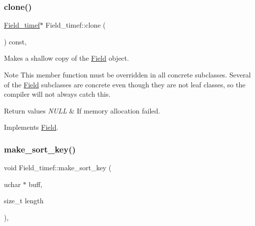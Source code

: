 \subsubsection{\texorpdfstring{clone()}{clone()}\hspace{0.1cm}{\footnotesize\ttfamily [2/2]}}
{\footnotesize\ttfamily \mbox{\hyperlink{classField__timef}{Field\+\_\+timef}}$\ast$ Field\+\_\+timef\+::clone (\begin{DoxyParamCaption}{ }\end{DoxyParamCaption}) const\hspace{0.3cm}{\ttfamily [inline]}, {\ttfamily [virtual]}}

Makes a shallow copy of the \mbox{\hyperlink{classField}{Field}} object.

\begin{DoxyNote}{Note}
This member function must be overridden in all concrete subclasses. Several of the \mbox{\hyperlink{classField}{Field}} subclasses are concrete even though they are not leaf classes, so the compiler will not always catch this.
\end{DoxyNote}

\begin{DoxyRetVals}{Return values}
{\em N\+U\+LL} & If memory allocation failed. \\
\hline
\end{DoxyRetVals}


Implements \mbox{\hyperlink{classField_a01a9a9aa3a618941e839b1b8793c969d}{Field}}.

\mbox{\label{classField__timef_a44d73ae1b0cb65c1f269a5a2c60acb29}} 
\subsubsection{\texorpdfstring{make\+\_\+sort\+\_\+key()}{make\_sort\_key()}}
{\footnotesize\ttfamily void Field\+\_\+timef\+::make\+\_\+sort\+\_\+key (\begin{DoxyParamCaption}\item[{uchar $\ast$}]{buff,  }\item[{size\+\_\+t}]{length }\end{DoxyParamCaption})\hspace{0.3cm}{\ttfamily [inline]}, {\ttfamily [virtual]}}

